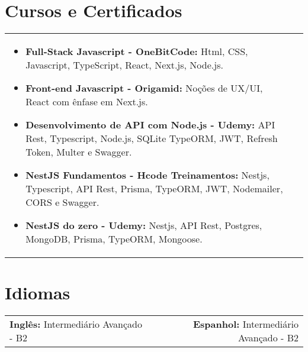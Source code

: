 \documentclass[a4paper,8pt]{article}
\begin{document}
\section{Cursos e Certificados}
\begin{tabularx}{\linewidth}{ @{}l r@{} }
\begin{minipage}[t]{\linewidth}
\begin{itemize}[nosep,after=\strut, leftmargin=2em, itemsep=2pt]
\item \textbf{Full-Stack Javascript - OneBitCode:} Html, CSS, Javascript, TypeScript, React, Next.js, Node.js.
\item \textbf{Front-end Javascript - Origamid:} Noções de UX/UI, React com ênfase em Next.js.
\item \textbf{Desenvolvimento de API com Node.js - Udemy:} API Rest, Typescript, Node.js, SQLite TypeORM, JWT, Refresh Token, Multer e Swagger.
\item \textbf{NestJS Fundamentos - Hcode Treinamentos:} Nestjs, Typescript, API Rest, Prisma, TypeORM, JWT, Nodemailer, CORS e Swagger.
\item \textbf{NestJS do zero - Udemy:} Nestjs, API Rest, Postgres, MongoDB, Prisma, TypeORM, Mongoose.
\end{itemize}
\end{minipage}
\end{tabularx}

\section{Idiomas}
\begin{tabularx}{\linewidth}{@{}X r@{}}
\textbf{Inglês:} Intermediário Avançado - B2 & \textbf{Espanhol:} Intermediário Avançado - B2
\end{tabularx}
\end{document}
